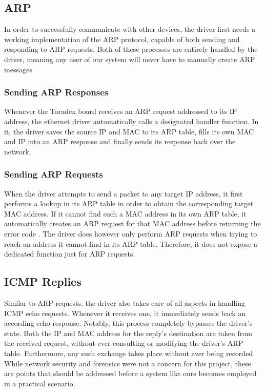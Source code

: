 \subsection{ARP}
In order to successfully communicate with other devices, the driver first needs a working implementation of the ARP protocol, capable of both sending and responding to ARP requests. Both of these processes are entirely handled by the driver, meaning any user of our system will never have to manually create ARP messages.

\subsubsection{Sending ARP Responses}
Whenever the Toradex board receives an ARP request addressed to its IP address, the ethernet driver automatically calls a designated handler function. In it, the driver saves the source IP and MAC to its ARP table, fills its own MAC and IP into an ARP response and finally sends its response back over the network.

\subsubsection{Sending ARP Requests}
When the driver attempts to send a packet to any target IP address, it first performs a lookup in its ARP table in order to obtain the corresponding target MAC address. If it cannot find such a MAC address in its own ARP table, it automatically creates an ARP request for that MAC address before returning the error code . The driver does however only perform ARP requests when trying to reach an address it cannot find in its ARP table. Therefore, it does not expose a dedicated function just for ARP requests.


\subsection{ICMP Replies}
Similar to ARP requests, the driver also takes care of all aspects in handling ICMP echo requests. Whenever it receives one, it immediately sends back an according echo response. Notably, this process completely bypasses the driver's state. Both the IP and MAC address for the reply's destination are taken from the received request, without ever consulting or modifying the driver's ARP table. Furthermore, any such exchange takes place without ever being recorded. While network security and forensics were not a concern for this project, these are points that should be addressed before a system like ours becomes employed in a practical scenario.

